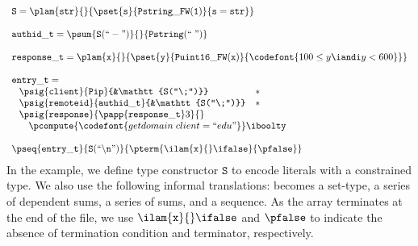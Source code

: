 {\small
\[
\begin{array}{l}
\mathtt{S} = \plam {\mathtt{str}} {} {\pset {\mathtt{s}}
  {\mathtt{Pstring\_FW(1)}} {\mathtt{s = str}}}\\
\\
\mathtt{authid\_t} = 
\psum {\mathtt{S(``-")}} {} {\mathtt{Pstring(``\;")}}\\
\\
\mathtt{response\_t} = \plam {\mathtt x} {} {
      \pset {\mathtt y} {\mathtt{Puint16\_FW(x)}} 
      {\codefont{100 \leq y \iandi y < 600}}
    }\\
\\
\mathtt{entry\_t} = \\ \;
\begin{array}{lll}
\psig {\mathtt{client}} {\mathtt{Pip}} {&\mathtt{S(``\;")}} &* \\
\psig {\mathtt{remoteid}} {\mathtt{authid\_t}} {&\mathtt{S(``\;")}} &* \\
\psig {\mathtt{response}} {
  \papp
    {\mathtt{response\_t}} 3
}{} \\
\multicolumn{3}{c}{
\quad \pcompute {\codefont{getdomain\;client = ``edu"}} \iboolty}
\end{array}\\
\\
\pseq {\mathtt{entry\_t}} {\mathtt{S(``\backslash n")}}{
  \pterm {\ilam {\mathtt x} {} \ifalse} {\pfalse}
}
\end{array}
\]}%
\noindent
In the example, we define type constructor $\mathtt{S}$ to encode literals
with a constrained type. We also use the following
informal translations: \Pwhere{} becomes a set-type, \Pstruct{} a
series of dependent sums, \Punion{} a series of sums, and
\Parray{} a sequence. As the array terminates at the end of the file, we
use $\ilam {\mathtt x} {} \ifalse$ and $\pfalse$ to indicate the
absence of termination condition and terminator, respectively.

